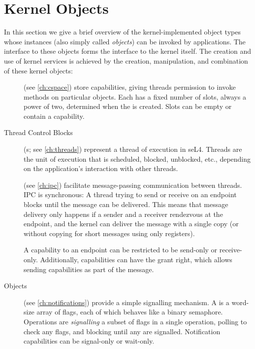 \section{Kernel Objects}
\label{s:sel4_internals}

In this section we give a brief overview of the kernel-implemented
object types whose instances (also simply called \emph{objects}) can be invoked by applications. The interface to these
objects forms the interface to the kernel itself. The creation and use
of kernel services is achieved by the creation,
manipulation, and combination of these kernel objects:

\begin{description}

    \item[] (see \autoref{ch:cspace}) store capabilities, giving threads permission to
    invoke methods on particular objects.
    Each  has a fixed number of slots,
    always a power of two, determined when the  is created. Slots
    can be empty or contain a capability.

    \item[Thread Control Blocks] (s; see \autoref{ch:threads}) represent a thread of
    execution in seL4. Threads are the unit of execution that is
    scheduled, blocked, unblocked, etc., depending on the application's
    interaction with other threads.

    \item[] (see \autoref{ch:ipc}) facilitate message-passing
    communication between threads. IPC is synchronous: A thread
    trying to send or receive on an endpoint blocks until the message
    can be delivered. This means that message delivery only happens if
    a sender and a receiver rendezvous at the endpoint, and the
    kernel can deliver the message with a single copy (or without
    copying for short messages using only registers).

    A capability to an endpoint can be restricted to be
    send-only or receive-only. Additionally, 
    capabilities can have the grant right, which allows sending
    capabilities as part of the message.

    \item[ Objects] (see \autoref{ch:notifications})
      provide a simple signalling mechanism. A 
      is a word-size array of flags, each of which behaves like a binary semaphore. Operations
      are \emph{signalling} a subset of flags in a single operation,
      polling to check any flags, 
      and blocking until any are signalled. Notification capabilities
      can be signal-only or wait-only.


\end{description}
